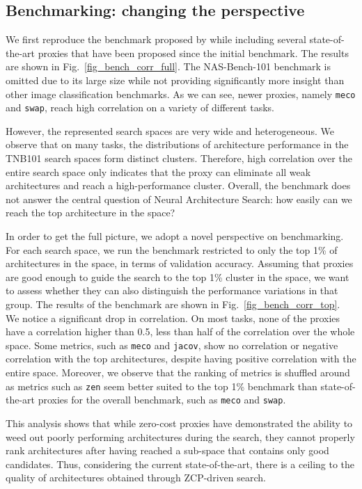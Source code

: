 \documentclass[10pt]{article} %
\begin{document}
\subsection{Benchmarking: changing the perspective}
\label{investigation_pov}

We first reproduce the benchmark proposed by \citet{krishnakumar2022bench} while including several state-of-the-art proxies that have been proposed since the initial benchmark. The results are shown in Fig.~\ref{fig_bench_corr_full}. The NAS-Bench-101 benchmark is omitted due to its large size while not providing significantly more insight than other image classification benchmarks. As we can see, newer proxies, namely \texttt{meco} and \texttt{swap}, reach high correlation on a variety of different tasks.

However, the represented search spaces are very wide and heterogeneous. We observe that on many tasks, the distributions of architecture performance in the TNB101 search spaces form distinct clusters. Therefore, high correlation over the entire search space only indicates that the proxy can eliminate all weak architectures and reach a high-performance cluster. Overall, the benchmark does not answer the central question of Neural Architecture Search: how easily can we reach the top architecture in the space?

In order to get the full picture, we adopt a novel perspective on benchmarking. For each search space, we run the benchmark restricted to only the top 1\% of architectures in the space, in terms of validation accuracy. Assuming that proxies are good enough to guide the search to the top 1\% cluster in the space, we want to assess whether they can also distinguish the performance variations in that group. The results of the benchmark are shown in Fig.~\ref{fig_bench_corr_top}. We notice a significant drop in correlation. On most tasks, none of the proxies have a correlation higher than 0.5, less than half of the correlation over the whole space. Some metrics, such as \texttt{meco} and \texttt{jacov}, show no correlation or negative correlation with the top architectures, despite having positive correlation with the entire space. Moreover, we observe that the ranking of metrics is shuffled around as metrics such as \texttt{zen} seem better suited to the top 1\% benchmark than state-of-the-art proxies for the overall benchmark, such as \texttt{meco} and \texttt{swap}.

This analysis shows that while zero-cost proxies have demonstrated the ability to weed out poorly performing architectures during the search, they cannot properly rank architectures after having reached a sub-space that contains only good candidates. Thus, considering the current state-of-the-art, there is a ceiling to the quality of architectures obtained through ZCP-driven search.
\end{document}
